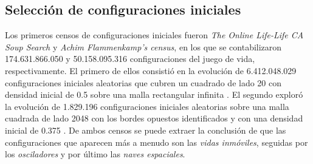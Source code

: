 \documentclass[../proyecto.tex]{memoir}
\begin{document}

\subsection{Selección de configuraciones iniciales} \label{seleccion}

Los primeros censos de configuraciones iniciales fueron \textit{The Online Life-Life CA Soup Search} y \textit{Achim Flammenkamp's census}, en los que se contabilizaron 174.631.866.050 y 50.158.095.316 configuraciones del juego de vida, respectivamente. El primero de ellos consistió en la evolución de 6.412.048.029 configuraciones iniciales aleatorias que cubren un cuadrado de lado 20 con densidad inicial de 0.5 sobre una malla rectangular infinita \cite{sopa1}. El segundo exploró la evolución de 1.829.196 configuraciones iniciales aleatorias sobre una malla cuadrada de lado 2048 con los bordes opuestos identificados y con una densidad inicial de 0.375 \cite{sopa2}. De ambos censos se puede extraer la conclusión de que las configuraciones que aparecen más a menudo son las \textit{vidas inmóviles}, seguidas por los \textit{osciladores} y por último las \textit{naves espaciales}.
\end{document}
